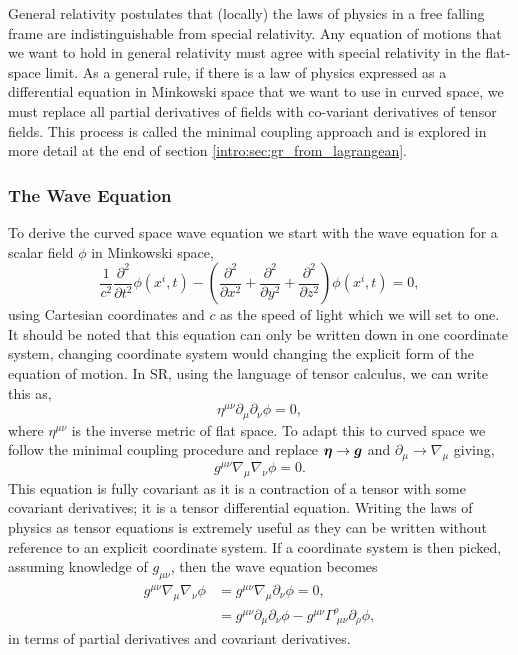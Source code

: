 General relativity postulates that (locally) the laws of physics in a free falling frame are indistinguishable from special relativity. Any equation of motions that we want to hold in general relativity must agree with special relativity in the flat-space limit. As a general rule, if there is a law of physics expressed as a differential equation in Minkowski space that we want to use in curved space, we must replace all partial derivatives of fields with co-variant derivatives of tensor fields. This process is called the minimal coupling approach and is explored in more detail at the end of section \ref{intro:sec:gr_from_lagrangean}.







\subsubsection{The Wave Equation}
To derive the curved space wave equation we start with the wave equation for a scalar field $\phi$ in Minkowski space, 
\begin{equation}
\frac{1}{c^2}\frac{\partial^2}{\partial t^2} \phi(x^i,t) - \left(\frac{\partial^2}{\partial x^2}+\frac{\partial^2}{\partial y^2}+\frac{\partial^2}{\partial z^2} \right)\phi(x^i,t)=0, \label{intro:eq:fullflatwave}
\end{equation}
using Cartesian coordinates and $c$ as the speed of light which we will set to one. It should be noted that this equation can only be written down in one coordinate system, changing coordinate system would changing the explicit form of the equation of motion. In SR, using the language of tensor calculus, we can write this as, 
\begin{equation}
\eta^{\mu\nu}\partial_\mu\partial_\nu\phi=0\label{intro:eq:waveeqn},
\end{equation}
where $\eta^{\mu\nu}$ is the inverse metric of flat space. To adapt this to curved space we follow the minimal coupling procedure and replace $\boldsymbol{\eta} \rightarrow \boldsymbol{g}$ and $\partial_\mu \rightarrow \nabla_\mu$ giving,
\begin{equation} 
g^{\mu\nu}\nabla_\mu \nabla_\nu\phi =0. \label{intro:eq:grwave}
\end{equation}
This equation is fully covariant as it is a contraction of a tensor with some covariant derivatives; it is a tensor differential equation. Writing the laws of physics as tensor equations is extremely useful as they can be written without reference to an explicit coordinate system. If a coordinate system is then picked, assuming knowledge of $g_{\mu\nu}$, then the wave equation becomes
\begin{align}
g^{\mu\nu}\nabla_\mu \nabla_\nu \phi &= g^{\mu\nu}\nabla_\mu \partial_\nu \phi =0,\\
&= g^{\mu\nu}\partial_\mu \partial_\nu \phi - g^{\mu\nu}\Gamma^\rho_{\,\,\mu\nu}\partial_\rho \phi,
\end{align}
in terms of partial derivatives and covariant derivatives. 

